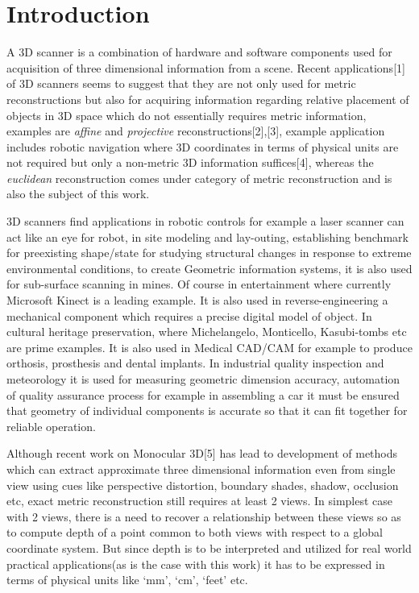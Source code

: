 \chapter{Introduction}

	
A 3D scanner is a combination of hardware and software components used for acquisition of three dimensional information from a scene.  Recent applications[1] of 3D scanners seems to suggest that they are not only used for metric reconstructions but also for acquiring information regarding relative placement of objects in 3D space which do not essentially requires metric information,  examples are \textit{affine} and \textit{projective} reconstructions[2],[3], example application includes robotic navigation where 3D coordinates in terms of physical units are not required but only a non-metric 3D information suffices[4], whereas the \textit{euclidean} reconstruction comes under category of metric reconstruction and is also the subject of this work.\newline


3D scanners find applications in robotic controls for example a laser scanner can act like an eye for robot, in site modeling and lay-outing, establishing benchmark for preexisting shape/state for studying structural changes in response to extreme environmental conditions, to create Geometric information systems, it is also used for sub-surface scanning in mines. Of course in entertainment where currently Microsoft Kinect is a leading example. It is also used in reverse-engineering a mechanical component which requires a precise digital model of object. In cultural heritage preservation, where Michelangelo, Monticello, Kasubi-tombs etc are prime examples. It is also used in Medical CAD/CAM for example to produce orthosis, prosthesis and dental implants. In industrial quality inspection and meteorology it is used for measuring geometric dimension accuracy, automation of quality assurance process for example in assembling a car it must be ensured that geometry of individual components is accurate so that it can fit together for reliable operation.\newline 


Although recent work on Monocular 3D[5] has lead to development of methods which can extract approximate three dimensional  information even from single view using cues like perspective distortion, boundary shades, shadow, occlusion etc, exact metric reconstruction still requires at least 2 views. In simplest case with 2 views, there is a need to recover a relationship between these views so as to compute depth of a point common to both views with respect to a global coordinate system. But since depth is to be interpreted and utilized for real world practical applications(as is the case with this work) it has to be expressed in terms of physical units like `mm', `cm', `feet' etc. \newline


